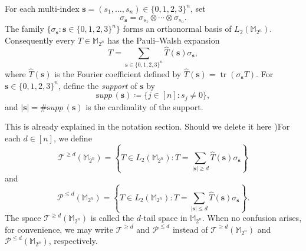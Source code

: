 \documentclass{amsbook}
\theoremstyle{definition}
\theoremstyle{remark}
\numberwithin{section}{chapter}
\numberwithin{equation}{chapter}
\newcommand{\M}{\mathbb{M}}
\newcommand{\1}{\mathbf{1}}
\newcommand{\s}{\mathbf{s}}
\newcommand{\supp}{{\mathrm supp}\,}
\begin{document}
For each multi-index $\s=(s_1,\ldots,s_n)\in\{0,1,2,3\}^n$, set
\[
 \sigma_{\s}=\sigma_{s_1}\otimes\cdots\otimes\sigma_{s_n}.
\]
The family $\{\sigma_{\s}:\s\in\{0,1,2,3\}^n\}$ forms an orthonormal basis of $L_2(\M_{2^n})$.  Consequently every $T\in\M_{2^n}$ has the Pauli--Walsh expansion
\[
 T=\sum_{\s\in\{0,1,2,3\}^n}\widehat T(\s)\sigma_{\s},
\]
where $ \widehat{T}(\mathbf{s})$ is the Fourier coefficient defined by $\widehat{T}(\mathbf{s}) = \operatorname{tr}(\sigma_{\mathbf{s}} T)$. For $\s\in\{0,1,2,3\}^n$, define the \emph{support} of $\s$ by
\[
 \supp(\s)\coloneqq \{j\in[n]:s_j\neq0\},
\]
and $|\s|=\#\supp(\s)$ is the cardinality of the support.

This is already explained in the notation section. Should we delete it here )For each $d\in [n]$, we define 
\[
\mathcal{T}^{\geq d}(\mathbb{M}_{2^n})=\left\{T\in L_{2}(\mathbb{M}_{2^n}):T=\sum_{|\s|\geq d}\widehat{T}(\s)\sigma_{\s}\right\}
\]
and 
\[
\mathcal{P}^{\leq d}(\mathbb{M}_{2^n})=\left\{T\in L_{2}(\mathbb{M}_{2^n}):T=\sum_{|\s|\leq d}\widehat{T}(\s)\sigma_{\s}\right\}.
\]
The space $\mathcal{T}^{\geq d}(\mathbb{M}_{2^n})$ is called the $d$-tail space in $\mathbb{M}_{2^n}$. When no confusion arises, for convenience, we may write $\mathcal{T}^{\geq d}$ and $\mathcal{P}^{\leq d}$ instead of $\mathcal{T}^{\geq d}(\mathbb{M}_{2^n})$ and $\mathcal{P}^{\leq d}(\mathbb{M}_{2^n})$, respectively.
\end{document}
